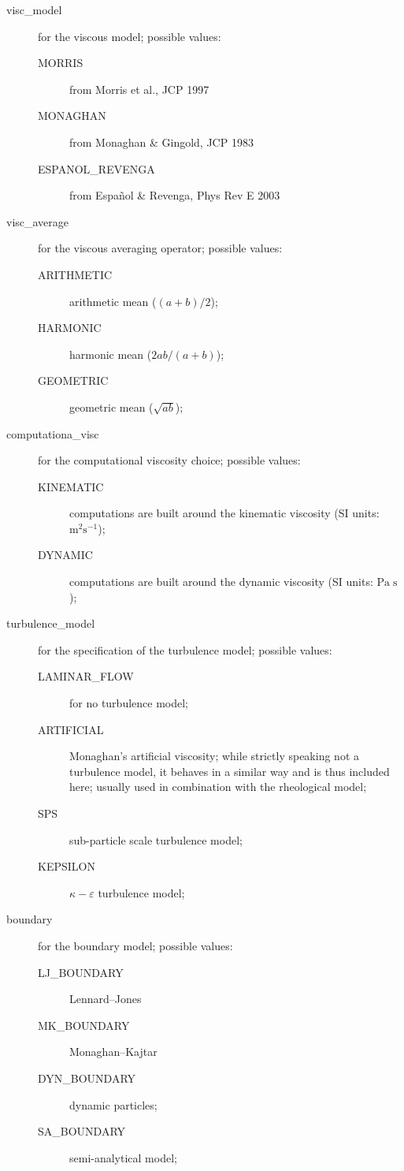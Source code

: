 \documentclass{../GPUSPHtemplate}
\begin{document}
\begin{description}
\item[visc_model] for the viscous model; possible values:
\begin{description}
\item[MORRIS] from Morris et al., JCP 1997
\item[MONAGHAN] from Monaghan \& Gingold, JCP 1983
\item[ESPANOL_REVENGA] from Espa\~nol \& Revenga, Phys Rev E 2003
\end{description}

\item[visc_average] for the viscous averaging operator; possible values:
\begin{description}
\item[ARITHMETIC] arithmetic mean ($(a+b)/2$);
\item[HARMONIC] harmonic mean ($2ab/(a+b)$);
\item[GEOMETRIC] geometric mean ($\sqrt{ab}$);
\end{description}

\item[computationa_visc] for the computational viscosity choice; possible values:
\begin{description}
\item[KINEMATIC] computations are built around the kinematic viscosity (SI units: $\text{m}^2 \text{s}^{-1}$);
\item[DYNAMIC] computations are built around the dynamic viscosity (SI units: $\text{Pa}\;\text{s}$);
\end{description}

\item[turbulence_model] for the specification of the turbulence model; possible values:
\begin{description}
\item[LAMINAR_FLOW] for no turbulence model;
\item[ARTIFICIAL] Monaghan's artificial viscosity; while strictly speaking not a turbulence model,
it behaves in a similar way and is thus included here; usually used in combination with the 
rheological model;
\item[SPS] sub-particle scale turbulence model;
\item[KEPSILON] $\kappa-\varepsilon$ turbulence model;
\end{description}

\item[boundary] for the boundary model; possible values:
\begin{description}
\item[LJ\_BOUNDARY] Lennard--Jones
\item[MK\_BOUNDARY] Monaghan--Kajtar
\item[DYN\_BOUNDARY] dynamic particles;
\item[SA\_BOUNDARY] semi-analytical model;
\end{description}


\end{description}
\end{document}
